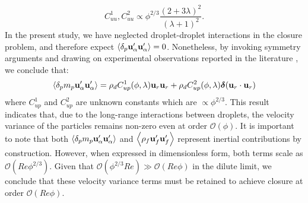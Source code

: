 \begin{equation}
C_{uu}^1, C_{uu}^2 \propto \phi^{2/3} \frac{(2+3\lambda)^2}{(\lambda+1)^2}.
\end{equation}
In the present study, we have neglected droplet-droplet interactions in the closure problem, and therefore expect $\left<\delta_{p} \textbf{u}_\alpha'\textbf{u}_\alpha'\right> = 0$. 
Nonetheless, by invoking symmetry arguments and drawing on experimental observations reported in the literature \citep{guazzelli2011fluctuations}, we conclude that:
\begin{equation}
    \pavg{m_p \textbf{u}_\alpha'\textbf{u}_\alpha'}
    =
    \rho_d C^1_{up}(\phi,\lambda)\textbf{u}_r\textbf{u}_r
    + \rho_d C^2_{up}(\phi,\lambda) \bm\delta(\textbf{u}_r\cdot \textbf{u}_r)
    \label{eq:upup}
\end{equation}
where $C_{up}^1$ and $C_{up}^2$ are unknown constants which are $\propto \phi^{2/3}$\citep{guazzelli2011fluctuations}. 
This result indicates that, due to the long-range interactions between droplets, the velocity variance of the particles remains non-zero even at order $\mathcal{O}(\phi)$.
It is important to note that both $\left<\delta_{p} m_p \textbf{u}_\alpha'\textbf{u}_\alpha'\right>$ and $\left<\rho_f \textbf{u}_f'\textbf{u}_f'\right>$ represent inertial contributions by construction.
However, when expressed in dimensionless form, both terms scale as $\mathcal{O}(Re  \phi^{2/3})$.
Given that $\mathcal{O}(\phi^{2/3}Re) \gg \mathcal{O}(Re\phi)$ in the dilute limit, we conclude that these velocity variance terms must be retained to achieve closure at order $\mathcal{O}(Re\phi)$.


